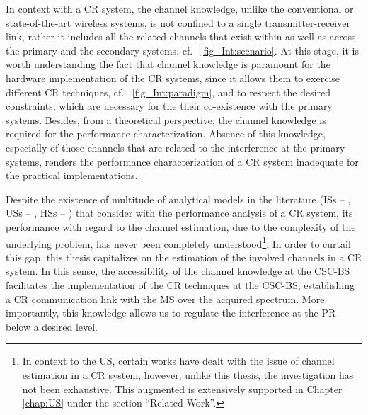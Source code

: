 In context with a CR system, the channel knowledge, unlike the conventional or state-of-the-art wireless systems, is not confined to a single transmitter-receiver link, rather it includes all the related channels that exist within as-well-as across the primary and the secondary systems, cf. \figurename~\ref{fig_Int:scenario}. At this stage, it is worth understanding the fact that channel knowledge is paramount for the hardware implementation of the CR systems, since it allows them to exercise different CR techniques, cf. \figurename~\ref{fig_Int:paradigm}, and to respect the desired constraints, which are necessary for the their co-existence with the primary systems. Besides, from a theoretical perspective, the channel knowledge is required for the performance characterization. Absence of this knowledge, especially of those channels that are related to the interference at the primary systems, renders the performance characterization of a CR system inadequate for the practical implementations. 

Despite the existence of multitude of analytical models in the literature (ISs -- \cite{Liang08, Sharma14, Pradhan15}, USs -- \cite{Xing07, Ghasemi07, Kang09}, HSs -- \cite{Song13, Gmira15, Jiang13, Fili15}) that consider with the performance analysis of a CR system, its performance with regard to the channel estimation, due to the complexity of the underlying problem, has never been completely understood\footnote{In context to the US, certain works \cite{Musa09, Suraweera10, Kim12} have dealt with the issue of channel estimation in a CR system, however, unlike this thesis, the investigation has not been exhaustive. This augmented is extensively supported in Chapter \ref{chap:US} under the section ``Related Work''.}. In order to curtail this gap, this thesis capitalizes on the estimation of the involved channels in a CR system. In this sense, the accessibility of the channel knowledge at the CSC-BS facilitates the implementation of the CR techniques at the CSC-BS, establishing a CR communication link with the MS over the acquired spectrum. More importantly, this knowledge allows us to regulate the interference at the PR below a desired level. 

